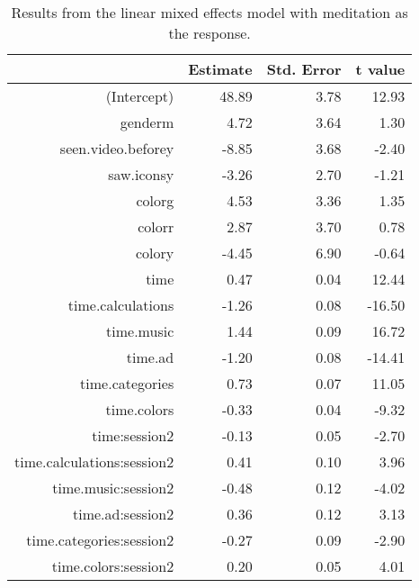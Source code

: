 \begin{table}[ht]
\centering
\begin{tabular}{rrrr}
  \hline
 & Estimate & Std. Error & t value \\ 
  \hline
(Intercept) & 48.89 & 3.78 & 12.93 \\ 
  genderm & 4.72 & 3.64 & 1.30 \\ 
  seen.video.beforey & -8.85 & 3.68 & -2.40 \\ 
  saw.iconsy & -3.26 & 2.70 & -1.21 \\ 
  colorg & 4.53 & 3.36 & 1.35 \\ 
  colorr & 2.87 & 3.70 & 0.78 \\ 
  colory & -4.45 & 6.90 & -0.64 \\ 
  time & 0.47 & 0.04 & 12.44 \\ 
  time.calculations & -1.26 & 0.08 & -16.50 \\ 
  time.music & 1.44 & 0.09 & 16.72 \\ 
  time.ad & -1.20 & 0.08 & -14.41 \\ 
  time.categories & 0.73 & 0.07 & 11.05 \\ 
  time.colors & -0.33 & 0.04 & -9.32 \\ 
  time:session2 & -0.13 & 0.05 & -2.70 \\ 
  time.calculations:session2 & 0.41 & 0.10 & 3.96 \\ 
  time.music:session2 & -0.48 & 0.12 & -4.02 \\ 
  time.ad:session2 & 0.36 & 0.12 & 3.13 \\ 
  time.categories:session2 & -0.27 & 0.09 & -2.90 \\ 
  time.colors:session2 & 0.20 & 0.05 & 4.01 \\ 
   \hline
\end{tabular}
\caption{Results from the linear mixed effects model
             with meditation as the response.} 
\label{tab:med}
\end{table}
